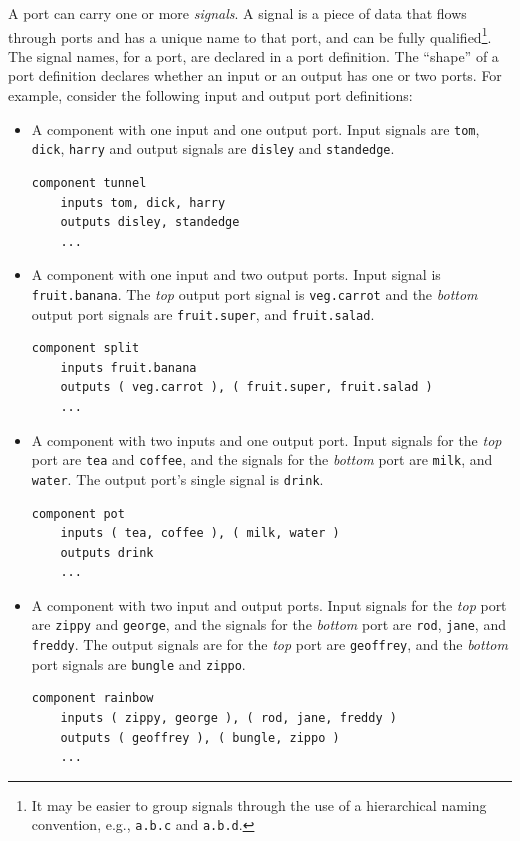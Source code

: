 A port can carry one or more \emph{signals}. A signal is a piece of data that flows through ports and has a unique name to that port, and can be fully qualified\footnote{It may be easier to group signals through the use of a hierarchical naming convention, e.g., \texttt{a.b.c} and \texttt{a.b.d}.}. The signal names, for a port, are declared in a port definition. The ``shape'' of a port definition declares whether an input or an output has one or two ports. For example, consider the following input and output port definitions:
\begin{itemize}
\item A component with one input and one output port. Input signals are \texttt{tom}, \texttt{dick}, \texttt{harry} and output signals are \texttt{disley} and \texttt{standedge}.
\begin{center}
\begin{verbatim}
component tunnel
    inputs tom, dick, harry
    outputs disley, standedge
    ...
\end{verbatim}
\end{center}

\item A component with one input and two output ports. Input signal is \texttt{fruit.banana}. The \emph{top} output port signal is \texttt{veg.carrot} and the \emph{bottom} output port signals are \texttt{fruit.super}, and \texttt{fruit.salad}.
\begin{center}
\begin{verbatim}
component split
    inputs fruit.banana
    outputs ( veg.carrot ), ( fruit.super, fruit.salad )
    ...
\end{verbatim}
\end{center}

\item A component with two inputs and one output port. Input signals for the \emph{top} port are \texttt{tea} and \texttt{coffee}, and the signals for the \emph{bottom} port are \texttt{milk}, and \texttt{water}. The output port's single signal is \texttt{drink}.
\begin{center}
\begin{verbatim}
component pot
    inputs ( tea, coffee ), ( milk, water )
    outputs drink
    ...
\end{verbatim}
\end{center}

\item A component with two input and output ports. Input signals for the \emph{top} port are \texttt{zippy} and \texttt{george}, and the signals for the \emph{bottom} port are \texttt{rod}, \texttt{jane}, and \texttt{freddy}. The output signals are for the \emph{top} port are \texttt{geoffrey}, and the \emph{bottom} port signals are \texttt{bungle} and \texttt{zippo}.
\begin{center}
\begin{verbatim}
component rainbow
    inputs ( zippy, george ), ( rod, jane, freddy )
    outputs ( geoffrey ), ( bungle, zippo )
    ...
\end{verbatim}
\end{center}

\end {itemize}

